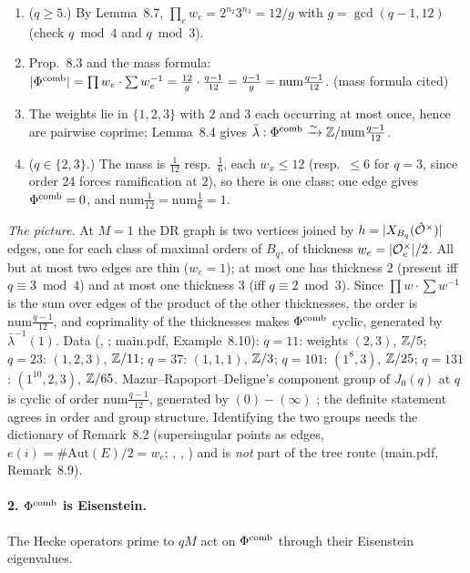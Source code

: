 \begin{outline}
\begin{enumerate}[label=(\arabic*)]
\item ($q\ge5$.) By Lemma~8.7, $\prod_ew_e=2^{n_2}3^{n_3}=12/g$ with $g=\gcd(q-1,12)$ (check $q\bmod4$ and $q\bmod3$). \stpmc
\item Prop.~8.3 and the mass formula: $|\Phi^{\mathrm{comb}}|=\prod w_e\cdot\sum w_e^{-1}=\frac{12}g\cdot\frac{q-1}{12}=\frac{q-1}g=\mathrm{num}\frac{q-1}{12}$. \stpmc{} (mass formula cited)
\item The weights lie in $\{1,2,3\}$ with $2$ and $3$ each occurring at most once, hence are pairwise coprime; Lemma~8.4 gives
  $\bar\lambda:\Phi^{\mathrm{comb}}\xrightarrow\sim\mathbb{Z}/\mathrm{num}\frac{q-1}{12}$. \stproved
\item ($q\in\{2,3\}$.) The mass is $\frac1{12}$ resp.\ $\frac16$, each $w_x\le12$ (resp.\ $\le6$ for $q=3$, since order $24$ forces ramification at $2$),
  so there is one class; one edge gives $\Phi^{\mathrm{comb}}=0$, and $\mathrm{num}\frac1{12}=\mathrm{num}\frac16=1$. \stpmc
\end{enumerate}
\emph{The picture.} At $M=1$ the DR graph is two vertices joined by $h=|X_{B_q}(\hat{\mathcal{O}}^\times)|$ edges, one for each class of maximal orders of
$B_q$, of thickness $w_e=|\mathcal{O}_e^\times|/2$. All but at most two edges are thin ($w_e=1$); at most one has thickness $2$ (present iff
$q\equiv3\bmod4$) and at most one thickness $3$ (iff $q\equiv2\bmod3$). Since $\prod w\cdot\sum w^{-1}$ is the sum over edges of the product of the
other thicknesses, the order is $\mathrm{num}\frac{q-1}{12}$, and coprimality of the thicknesses makes $\Phi^{\mathrm{comb}}$ cyclic, generated by
$\bar\lambda^{-1}(1)$. Data (\stcomp, ; main.pdf, Example~8.10): $q=11$: weights $(2,3)$, $\mathbb{Z}/5$; $q=23$: $(1,2,3)$, $\mathbb{Z}/11$;
$q=37$: $(1,1,1)$, $\mathbb{Z}/3$; $q=101$: $(1^8,3)$, $\mathbb{Z}/25$; $q=131$: $(1^{10},2,3)$, $\mathbb{Z}/65$.
Mazur--Rapoport--Deligne's component group of $J_0(q)$ at $q$ is cyclic of order $\mathrm{num}\frac{q-1}{12}$, generated by $(0)-(\infty)$
\cite[App.\ Thm A.1(b), p.~173]{Mz} \stcited; the definite statement agrees in order and group structure. Identifying the two groups needs the
dictionary of Remark~8.2 (supersingular points as edges, $e(i)=\#\mathrm{Aut}(E)/2=w_e$; \cite[Prop.~3.1, 3.3, pp.~439--440]{Ri90},
\cite[VI Th.~6.9(iii)]{DR}, \stcited) and is \emph{not} part of the tree route (main.pdf, Remark~8.9).
\end{outline}

\paragraph{2. $\Phi^{\mathrm{comb}}$ is Eisenstein.} The Hecke operators prime to $qM$ act on $\Phi^{\mathrm{comb}}$ through their Eisenstein eigenvalues.


